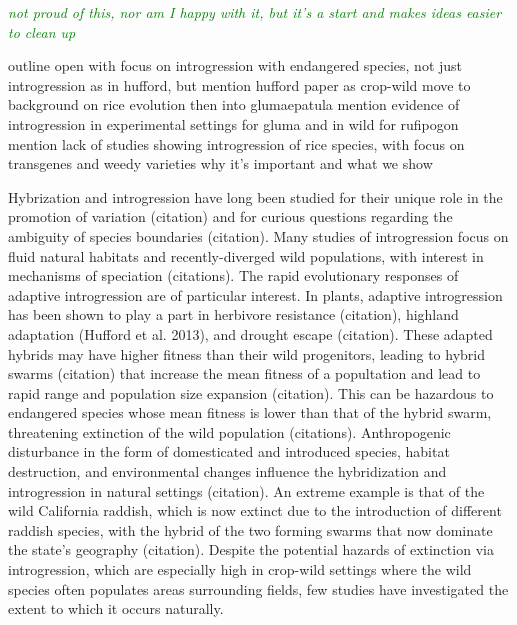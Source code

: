 \documentclass[11pt]{article} %
\newcommand{\jri}[1]{\textcolor{blue}{ \emph{\scriptsize  #1}} } %
\newcommand{\tvk}[1]{\textcolor{green}{ \emph{\scriptsize  #1}} } %
\begin{document}
\tvk{not proud of this, nor am I happy with it, but it’s a start and makes ideas easier to clean up}

outline
open with focus on introgression with endangered species, not just introgression as in hufford, but mention hufford paper as crop-wild
move to background on rice evolution
 then into glumaepatula
mention evidence of introgression in experimental settings for gluma and in wild for rufipogon
mention lack of studies showing introgression of rice species, with focus on transgenes and weedy varieties 
why it’s important and what we show
	

Hybrization and introgression have long been studied for their unique role in the promotion of variation (citation) and for curious questions regarding the ambiguity of species boundaries (citation). Many studies of introgression focus on fluid natural habitats and recently-diverged wild populations, with interest in mechanisms of speciation (citations).  The rapid evolutionary responses of adaptive introgression are of particular interest.  In plants, adaptive introgression has been shown to play a part in herbivore resistance (citation), highland adaptation (Hufford et al. 2013), and drought escape (citation).  These adapted hybrids may have higher fitness than their wild progenitors, leading to hybrid swarms (citation) that increase the mean fitness of a popultation and lead to rapid range and population size expansion (citation).  This can be hazardous to endangered species whose mean fitness is lower than that of the hybrid swarm, threatening extinction of the wild population (citations).  Anthropogenic disturbance in the form of domesticated and introduced species, habitat destruction, and environmental changes influence the hybridization and introgression in natural settings (citation).  An extreme example is that of the wild California raddish, which is now extinct due to the introduction of different raddish species, with the hybrid of the two forming swarms that now dominate the state’s geography (citation). Despite the potential hazards of extinction via introgression, which are especially high in crop-wild settings where the wild species often populates areas surrounding fields, few studies have investigated the extent to which it occurs naturally. 
\end{document}
